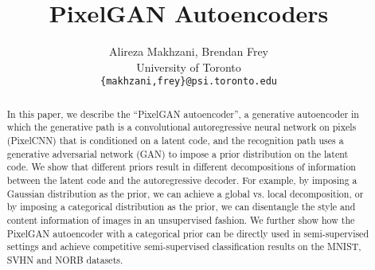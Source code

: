 \documentclass{article}
\title{PixelGAN Autoencoders}
\author{
Alireza Makhzani, Brendan Frey\\
University of Toronto\\
\texttt{\{makhzani,frey\}@psi.toronto.edu}
}
\begin{document}
\maketitle

\begin{abstract}
In this paper, we describe the ``PixelGAN autoencoder'', a generative autoencoder in which the generative path is a convolutional autoregressive neural network on pixels (PixelCNN) that is conditioned on a latent code, and the recognition path uses a generative adversarial network (GAN) to impose a prior distribution on the latent code. We show that different priors result in different decompositions of information between the latent code and the autoregressive decoder. For example, by imposing a Gaussian distribution as the prior, we can achieve a global vs. local decomposition, or by imposing a categorical distribution as the prior, we can disentangle the style and content information of images in an unsupervised fashion. We further show how the PixelGAN autoencoder with a categorical prior can be directly used in semi-supervised settings and achieve competitive semi-supervised classification results on the MNIST, SVHN and NORB datasets.
\end{abstract}
\end{document}
